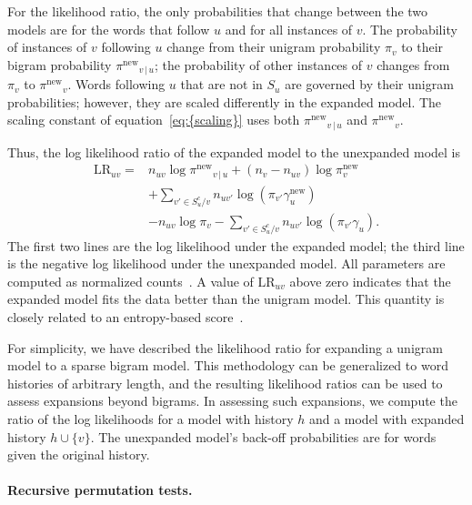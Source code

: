 \documentclass[11pt]{article}
\begin{document}
For the likelihood ratio, the only probabilities that change between
the two models are for the words that follow $u$ and for all instances
of $v$.  The probability of instances of $v$ following $u$ change from
their unigram probability $\pi_v$ to their bigram probability
${\pi^{\textrm{new}}}_{v {\,|\,} u}$; the probability of other instances of $v$ changes
from $\pi_v$ to ${\pi^{\textrm{new}}}_v$. Words following $u$ that are not in $S_u$
are governed by their unigram probabilities; however, they are scaled
differently in the expanded model. The scaling constant of
{equation~\eqref{eq:{scaling}}} uses both ${\pi^{\textrm{new}}}_{v {\,|\,} u}$ and ${\pi^{\textrm{new}}}_{v}$.

Thus, the log likelihood ratio of the expanded model to the unexpanded
model is
\begin{align}
  \label{eq:score}
  \nonumber {\textrm{LR}}_{uv} = & n_{uv} \log {\pi^{\textrm{new}}}_{v {\,|\,} u} + (n_v - n_{uv})
  \log \pi^{\textrm{new}}_{v} \\
  & + \textstyle \sum_{v' \in S^c_u \slash v} n_{uv'} \log
  (\pi_{v'}
  \gamma^{\textrm{new}}_u) \\
  & \nonumber - n_{uv} \log \pi_v - \textstyle \sum_{v' \in S^c_u
    \slash v} n_{uv'} \log (\pi_{v'} \gamma_u).
\end{align}
The first two lines are the log likelihood under the expanded model;
the third line is the negative log likelihood under the unexpanded
model.  All parameters are computed as normalized
counts~\citep{Katz:1987}.  A value of ${\textrm{LR}}_{uv}$ above zero indicates
that the expanded model fits the data better than the unigram model.
This quantity is closely related to an entropy-based
score~\cite{Stolcke:1998}.

For simplicity, we have described the likelihood ratio for expanding a
unigram model to a sparse bigram model.  This methodology can be
generalized to word histories of arbitrary length, and the resulting
likelihood ratios can be used to assess expansions beyond bigrams.  In
assessing such expansions, we compute the ratio of the log likelihoods
for a model with history ${h}$ and a model with expanded history
${h} \cup \{v\}$.  The unexpanded model's back-off probabilities are
for words given the original history.

\paragraph{Recursive permutation tests.}
\end{document}
